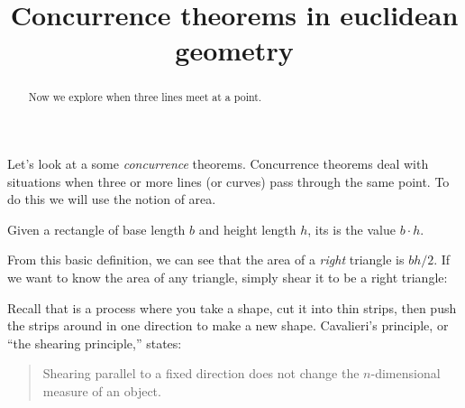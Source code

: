 \documentclass[newpage,hints,handout,nooutcomes,noauthor,12pt]{ximera}
\title{Concurrence theorems in euclidean geometry}
\begin{document}
\begin{abstract}
Now we explore when three lines meet at a point.
\end{abstract}
\maketitle

Let's look at a some \textit{concurrence} theorems. Concurrence
theorems deal with situations when three or more lines (or curves)
pass through the same point. To do this we will use the notion of
area.

\begin{definition}
  Given a rectangle of base length $b$ and height length $h$, its
   is the value $b\cdot h$.
\end{definition}

From this basic definition, we can see that the area of a
\textit{right} triangle is $bh/2$.  If we want to know the area of any
triangle, simply shear it to be a right triangle:
      \begin{center}
      \end{center}
Recall that  is a process where you take a shape, cut
it into thin strips, then push the strips around in one direction to
make a new shape.  Cavalieri's principle, or ``the shearing
principle,'' states:
  \begin{quote}
    Shearing parallel to a fixed direction does not change the
    $n$-dimensional measure of an object.
  \end{quote}
\end{document}
